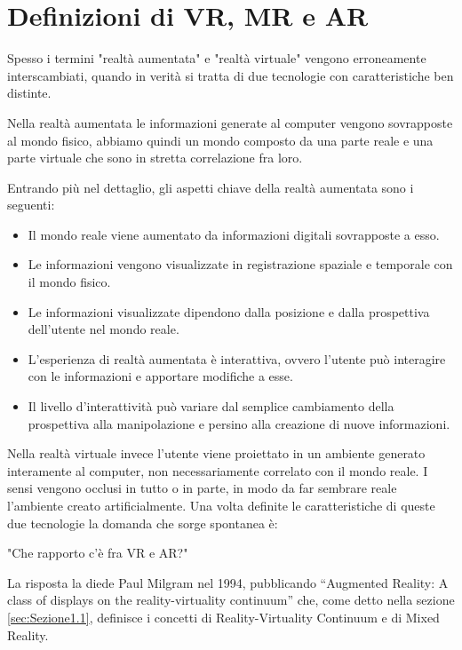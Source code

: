 \section{Definizioni di VR, MR e AR}\label{sec:Sezione1.2}
Spesso i termini "realtà aumentata" e "realtà virtuale" vengono erroneamente interscambiati, quando in verità si tratta di due tecnologie con caratteristiche ben distinte.

Nella realtà aumentata le informazioni generate al computer vengono sovrapposte al mondo fisico, abbiamo quindi un mondo composto da una parte reale e una parte virtuale che sono in stretta correlazione fra loro. 

Entrando più nel dettaglio, gli aspetti chiave della realtà aumentata sono i seguenti:

\begin{itemize}
    \item Il mondo reale viene aumentato da informazioni digitali sovrapposte a esso.
    \item Le informazioni vengono visualizzate in registrazione spaziale e temporale con il mondo fisico.
    \item Le informazioni visualizzate dipendono dalla posizione e dalla prospettiva dell’utente nel mondo reale.
    \item L'esperienza di realtà aumentata è interattiva, ovvero l’utente può interagire con le informazioni e apportare modifiche a esse.
    \item Il livello d'interattività può variare dal semplice cambiamento della prospettiva alla manipolazione e persino alla creazione di nuove informazioni.
\end{itemize}

Nella realtà virtuale invece l’utente viene proiettato in un ambiente generato interamente al computer, non necessariamente correlato con il mondo reale.
I sensi vengono occlusi in tutto o in parte, in modo da far sembrare reale l’ambiente creato artificialmente.
Una volta definite le caratteristiche di queste due tecnologie la domanda che sorge spontanea è:
\begin{center}
"Che rapporto c’è fra VR e AR?"
\end{center}
La risposta la diede Paul Milgram nel 1994, pubblicando “Augmented Reality: A class of displays on the reality-virtuality continuum” \cite{Milgram} che, come detto nella sezione \ref{sec:Sezione1.1}, definisce i concetti di Reality-Virtuality Continuum e di Mixed Reality. 

